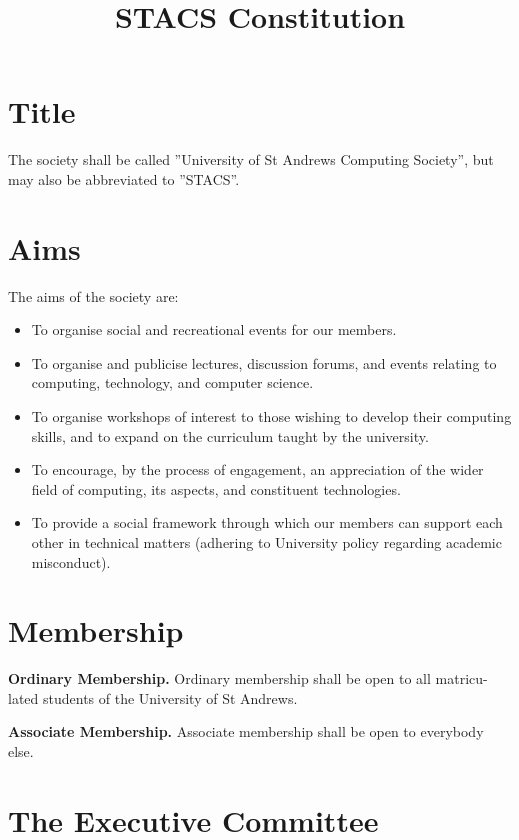 \documentclass{article}
\title{STACS Constitution}
\date{}
\begin{document}
\maketitle


\section{Title}

The society shall be called ”University of St Andrews Computing Society”, but
may also be abbreviated to ”STACS”.

\section{Aims}

The aims of the society are:

\begin{itemize}
    \item To organise social and recreational events for our members.
    \item To organise and publicise lectures, discussion forums, and events relating to computing, technology, and computer science.
    \item To organise workshops of interest to those wishing to develop their computing skills, and to expand on the curriculum taught by the university.
    \item To encourage, by the process of engagement, an appreciation of the wider field of computing, its aspects, and constituent technologies.
    \item To provide a social framework through which our members can support each other in technical matters (adhering to University policy regarding academic misconduct).
\end{itemize}

\section{Membership}

\textbf{Ordinary Membership.} Ordinary membership shall be open to all matricu-
lated students of the University of St Andrews.

\noindent \textbf{Associate Membership.} Associate membership shall be open to everybody
else.

\section{The Executive Committee}
\end{document}
